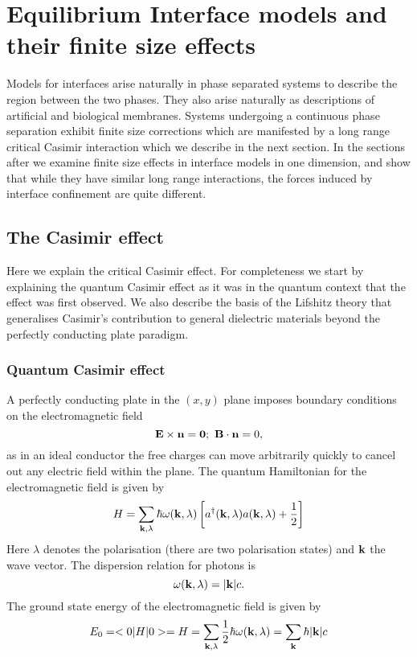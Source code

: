 \chapter{Equilibrium Interface models and their finite size effects}

Models for interfaces arise naturally in phase separated systems to describe the region between the two phases. They also arise naturally as descriptions of artificial and biological membranes. Systems undergoing a continuous phase separation exhibit finite size corrections which are manifested by a long range critical Casimir interaction which we describe in the next section. In the sections after we examine finite size effects in interface models in one dimension, and show that while they have similar long range interactions, the forces induced by interface confinement are quite different.

    \section{The Casimir effect}
    
Here we explain the critical Casimir effect. For completeness we start by explaining the quantum Casimir effect as it was in the quantum context that the effect was first observed.
We also describe the basis of the Lifshitz theory that generalises Casimir's contribution to 
general dielectric materials beyond the perfectly conducting plate paradigm.
    
    \subsection{Quantum Casimir effect}
A perfectly  conducting plate in the $(x,y)$ plane imposes boundary conditions on the electromagnetic field
\begin{equation}
    {\bf E}\times {\bf n} = {\bf 0};\ {\bf B}\cdot {\bf n} = 0,
\end{equation}
as in an ideal conductor the free charges can move arbitrarily quickly to cancel out any electric field within the plane. 
The quantum Hamiltonian for the electromagnetic field is given by 
\begin{equation}
    H = \sum_{{\bf k},\lambda}\hbar \omega({\bf k},\lambda)\left[a^\dagger({\bf k},\lambda)a({\bf k},\lambda) + {1\over 2}\right]
\end{equation}
Here $\lambda$ denotes the polarisation (there are two polarisation states) and ${\bf k}$ the wave vector. The dispersion 
relation for photons is
\begin{equation}
    \omega({\bf k},\lambda) = |{\bf k}|c.
\end{equation}
The ground state energy of the electromagnetic field is given by
\begin{equation}
    E_0 = < 0|H|0> = H = \sum_{{\bf k},\lambda}{1\over 2}\hbar \omega({\bf k},\lambda)= \sum_{\bf k}\hbar |{\bf k}|c
\end{equation}

